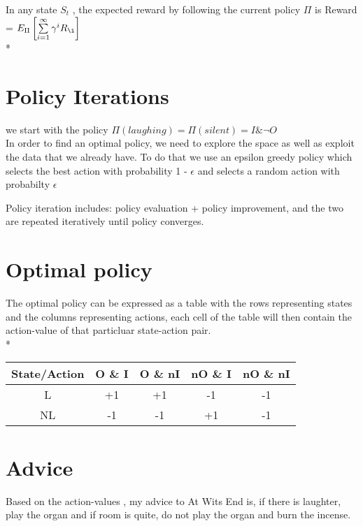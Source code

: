 \documentclass{article}
\begin{document}
In any state $ S_t$ , the expected reward by following the current policy $\Pi$ is
\vspace{5mm}
Reward = $E_\Pi \left[
\sum\limits_{i=1}^{\infty} \gamma^i R_{\i} \right]$\\*

\section{Policy Iterations}
we start with the policy $\Pi (laughing) = \Pi (silent) = I \& \neg O$\\
In order to find an optimal policy, we need to explore the space as well as exploit the data that we already have. To do that we use an epsilon greedy policy which
selects the best action with probability 1 - $\epsilon$ and selects a random action with probabilty $\epsilon$

Policy iteration includes: policy evaluation + policy improvement, and the two are repeated iteratively until policy converges.
\section{Optimal policy}

	The optimal policy can be expressed as a table with the rows representing states and the columns representing actions, each cell of the table will then 		contain
	the action-value of that particluar state-action pair.\\*

	\begin{table}
    	\begin{tabular}{|c|c|c|c|c|}
        	\hline
        	State/Action & O  \&  I & O  \&  nI & nO  \&  I & nO  \&  nI \\ \hline
        	L            & +1    & +1     & -1     & -1      \\ 
        	NL           & -1    & -1     & +1     & -1      \\
        	\hline
    	\end{tabular}
	\end{table}

\section{Advice}
Based on the action-values , my advice to At Wits End is, if there is laughter, play the organ and if room is quite, do not play the organ and burn the
incense.
\end{document}
